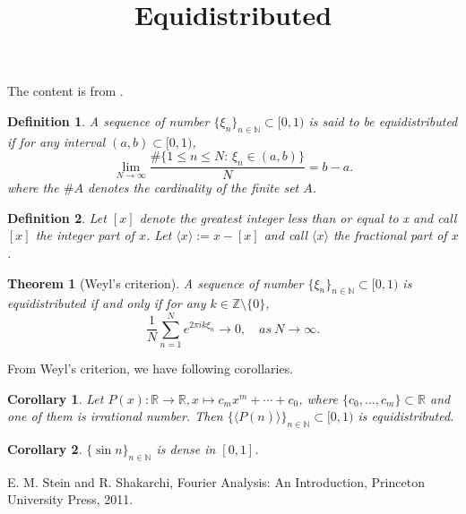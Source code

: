 \documentclass[a4paper,12pt]{article}
\title{Equidistributed}
\author{}
\date{}
\newtheorem{theorem}{Theorem}
\newtheorem{definition}{Definition}
\newtheorem{corollary}{Corollary}
\begin{document}
\maketitle

The content is from \cite[Chapter 4, Section 2]{ss11}.

\begin{definition}
    A sequence of number $ \{ \xi_n \}_{n \in \mathbb{N}} \subset [0, 1) $ is said to be equidistributed 
    if for any interval $ (a, b) \subset [0, 1) $, 
    $$ 
        \lim_{N \to \infty} \frac{ \# \{1 \leq n \leq N: \, \xi_n \in (a, b) \}}{N} = b - a. 
    $$
where the $ \# A $ denotes the cardinality of the finite set $ A $.
\end{definition}

\begin{definition}
    Let $ [x] $ denote the greatest integer less than or equal to x and call $ [x] $ the integer part of $ x $.
    Let $ \langle x \rangle := x - [x] $ and call $ \langle x \rangle $ the fractional part of $ x $.
\end{definition}

\begin{theorem}[Weyl's criterion]
    A sequence of number $ \{ \xi_n \}_{n \in \mathbb{N}} \subset [0, 1) $ is equidistributed 
    if and only if for any $ k \in \mathbb{Z} \setminus \{0\} $,
    $$ 
        \frac{1}{N}\sum_{n=1}^N e^{2 \pi i k \xi_{n}} \to 0, \quad as \ N \to \infty. 
    $$
\end{theorem}

From Weyl's criterion, we have following corollaries.

\begin{corollary}
    Let $ P(x) : \mathbb{R} \to \mathbb{R}, x \mapsto c_m x^m + \cdots + c_0 $, 
    where $ \{c_0, \ldots, c_m\} \subset \mathbb{R} $ and one of them is irrational number. 
    Then $ \{ \langle P(n) \rangle \}_{n \in \mathbb{N}} \subset [0, 1) $ is equidistributed.
\end{corollary}

\begin{corollary}
    $ \{ \sin n \}_{n \in \mathbb{N}} $ is dense in $ [0, 1] $.
\end{corollary}

\begin{thebibliography}{99}

     E. M. Stein and R. Shakarchi, Fourier Analysis: An Introduction, Princeton University Press, 2011.
    
\end{thebibliography}
\end{document}
